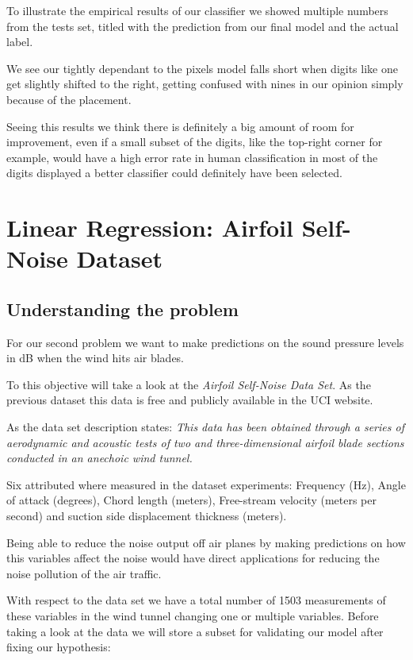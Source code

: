 \documentclass{article}
\begin{document}
To illustrate the empirical results of our classifier we showed multiple numbers from the tests set, titled with the prediction from our final model and the actual label.


We see our tightly dependant to the pixels model falls short when digits like one get slightly shifted to the right, getting confused with nines in our opinion simply because of the placement.

Seeing this results we think there is definitely a big amount of room for improvement, even if a small subset of the digits, like the top-right corner for example, would have a high error rate in human classification in most of the digits displayed a better classifier could definitely have been selected.


\newpage


{\section{Linear Regression: Airfoil Self-Noise Dataset}}


\subsection{Understanding the problem}
For our second problem we want to make predictions on the sound pressure levels in dB when the wind hits air blades.

To this objective will take a look at the \textit{Airfoil Self-Noise Data Set}. As the previous dataset this data is free and publicly available in the UCI website. \cite{Dua:2019}

As the data set description states: \textit{This data has been obtained through a series of aerodynamic and acoustic tests of two and three-dimensional airfoil blade sections conducted in an anechoic wind tunnel.}

Six attributed where measured in the dataset experiments: Frequency (Hz), Angle of attack (degrees), Chord length (meters), Free-stream velocity (meters per second) and suction side displacement thickness (meters).

Being able to reduce the noise output off air planes by making predictions on how this variables affect the noise would have direct applications for reducing the noise pollution of the air traffic.

With respect to the data set we have a total number of 1503 measurements of these variables in the wind tunnel changing one or multiple variables. Before taking a look at the data we will store a subset for validating our model after fixing our hypothesis:
\end{document}
